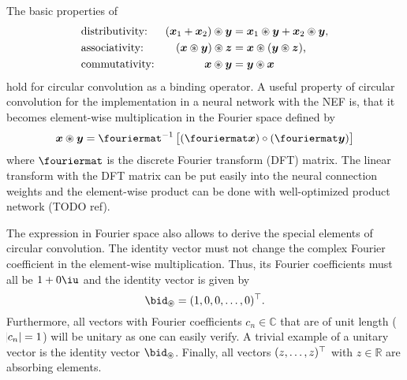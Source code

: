 The basic properties of
\begin{align}
    &\text{distributivity:} &(\bm{x}_1 + \bm{x}_2) \circledast \bm{y} &= \bm{x}_1 \circledast \bm{y} + \bm{x}_2 \circledast \bm{y} \text{,}\\
    &\text{associativity:} &(\bm{x} \circledast \bm{y}) \circledast \bm{z} &= \bm{x} \circledast (\bm{y} \circledast \bm{z}) \text{,} \\
    &\text{commutativity:} &\bm{x} \circledast \bm{y} &= \bm{y} \circledast \bm{x}
\end{align}
hold for circular convolution as a binding operator.
A useful property of circular convolution for the implementation in a neural network with the NEF is, that it becomes element-wise multiplication in the Fourier space defined by
\begin{equation}
    \vc x \circledast \vc y = \fouriermat^{-1}\sbr{(\fouriermat \vc x) \circ (\fouriermat \vc y)}
\end{equation}
where $\fouriermat$ is the discrete Fourier transform (DFT) matrix.
The linear transform with the DFT matrix can be put easily into the neural connection weights and the element-wise product can be done with well-optimized product network (TODO ref).

The expression in Fourier space also allows to derive the special elements of circular convolution.
The identity vector must not change the complex Fourier coefficient in the element-wise multiplication.
Thus, its Fourier coefficients must all be $1 + 0\iu$ and the identity vector is given by
\begin{equation}
    \bid_{\circledast} = (1, 0, 0, \dotsc, 0)\Tr \text{.}
\end{equation}
Furthermore, all vectors with Fourier coefficients $c_n \in \mathbb{C}$ that are of unit length ($\abs{c_n} = 1$) will be unitary as one can easily verify.
A trivial example of a unitary vector is the identity vector $\bid_{\circledast}$.
Finally, all vectors $(z, \dotsc, z)^{\top}$ with $z \in \mathbb{R}$ are absorbing elements.

